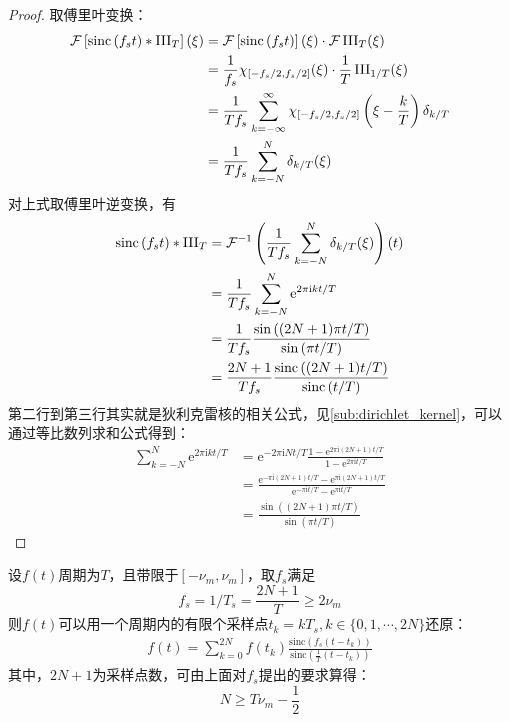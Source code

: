 \begin{proof}
    取傅里叶变换：
\begin{align*}
    \mathcal{F} \left[\text{sinc}\left(f_s t\right)*\operatorname{III}_T\right](\xi)&=\mathcal{F} \left[\text{sinc}\left(f_s t\right)\right](\xi)\cdot\mathcal{F} \operatorname{III}_T(\xi)\\
    &=\frac{1}{f_s}\chi_{[-f_s/2,f_s/2]}(\xi)\cdot\frac{1}{T}\operatorname{III}_{1/T}(\xi)\\
    &=\frac{1}{T f_s}\sum_{k=-\infty}^{\infty}\chi_{[-f_s/2,f_s/2]}\left(\xi-\frac{k}{T}\right)\delta_{k/T}\\
    &=\frac{1}{T f_s}\sum_{k=-N}^{N}\delta_{k/T}(\xi)
\end{align*}
对上式取傅里叶逆变换，有
\begin{align*}
    \text{sinc}\left(f_s t\right)*\operatorname{III}_T&=\mathcal{F} ^{-1}\left(\frac{1}{T f_s}\sum_{k=-N}^{N}\delta_{k/T}(\xi)\right)(t)\\
    &=\frac{1}{T f_s}\sum_{k=-N}^{N}\mathrm{e}^{2\pi \mathrm{i}kt/T}\\
    &=\frac{1}{T f_s}\frac{\sin\left((2N+1)\pi t/T\right)}{\sin\left(\pi t/T\right)}\\
    &=\frac{2N+1}{T f_s}\frac{\text{sinc}\left((2N+1)t/T\right)}{\text{sinc}\left(t/T\right)}
\end{align*}
第二行到第三行其实就是狄利克雷核的相关公式，见\ref{sub:dirichlet_kernel}，可以通过等比数列求和公式得到：\begin{align*}
    \sum_{k=-N}^{N}\mathrm{e}^{2\pi \mathrm{i}kt/T}&=\mathrm{e}^{-2\pi \mathrm{i}Nt/T}\frac{1-\mathrm{e}^{2\pi \mathrm{i}(2N+1)t/T}}{1-\mathrm{e}^{2\pi \mathrm{i}t/T}}\\
    &=\frac{\mathrm{e}^{-\pi \mathrm{i}(2N+1)t/T}-\mathrm{e}^{\pi \mathrm{i}(2N+1)t/T}}{\mathrm{e}^{-\pi \mathrm{i}t/T}-\mathrm{e}^{\pi \mathrm{i}t/T}}\\
    &=\frac{\sin\left((2N+1)\pi t/T\right)}{\sin\left(\pi t/T\right)}
\end{align*}
\end{proof}
\begin{proposition}[有限采样公式]
    设$f(t)$周期为$T$，且带限于$[-\nu_m,\nu_m]$，取$f_s$满足
    $$f_s=1/T_s=\frac{2N+1}{T}\geq 2\nu_m$$
    则$f(t)$可以用一个周期内的有限个采样点$t_k=kT_s,k\in\{0,1,\cdots,2N\}$还原：
    \begin{align*}
        f(t)=\sum_{k=0}^{2N}f(t_k)\frac{\text{sinc}\left(f_s(t-t_k)\right)}{\text{sinc}\left(\frac{1}{T}(t-t_k)\right)}
    \end{align*}
    其中，$2N+1$为采样点数，可由上面对$f_s$提出的要求算得：
    $$N\geq T\nu_m-\dfrac{1}{2}$$
\end{proposition}
